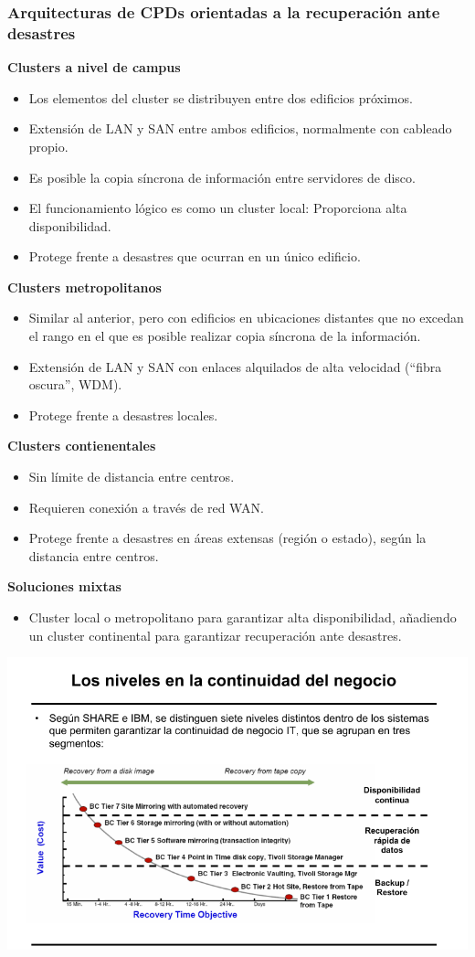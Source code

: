 \subsubsection{Arquitecturas de CPDs orientadas a la recuperación ante desastres}
\textbf{Clusters a nivel de campus}
\begin{itemize}
\item Los elementos del cluster se distribuyen entre dos edificios próximos.
\item Extensión de LAN y SAN entre ambos edificios, normalmente con cableado propio.
\item Es posible la copia síncrona de información entre servidores de disco.
\item El funcionamiento lógico es como un cluster local: Proporciona alta disponibilidad.
\item Protege frente a desastres que ocurran en un único edificio.

\end{itemize}

\textbf{Clusters metropolitanos}
\begin{itemize}
\item Similar al anterior, pero con edificios en ubicaciones distantes que no excedan el rango en el que es posible realizar copia síncrona de la información.
\item Extensión de LAN y SAN con enlaces alquilados de alta velocidad (“fibra oscura”, WDM).
\item Protege frente a desastres locales.

\end{itemize}

\textbf{Clusters contienentales}
\begin{itemize}
\item Sin límite de distancia entre centros.
\item Requieren conexión a través de red WAN.
\item Protege frente a desastres en áreas extensas (región o estado), según la distancia entre centros.

\end{itemize}
\newpage
\textbf{Soluciones mixtas}
\begin{itemize}
\item Cluster local o metropolitano para garantizar alta disponibilidad, añadiendo un cluster continental para garantizar recuperación ante desastres.

\end{itemize}

\begin{center}
\includegraphics[width=\linewidth]{img/continuidad_negocio.png}
\end{center}
\printindex